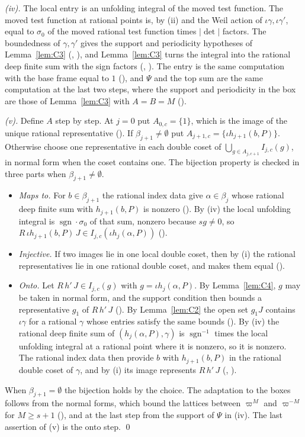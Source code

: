 \documentclass[11pt]{article}
\newcommand{\sgn}{\operatorname{sgn}}
\theoremstyle{definition}
\theoremstyle{remark}
\begin{document}
\emph{(iv).} The local entry is an unfolding integral of the moved test function. The moved test function at rational points is, by (ii) and the Weil action of $\iota\gamma,\iota\gamma'$, equal to $\sigma_0$ of the moved rational test function times $\lvert\det\rvert$ factors. The boundedness of $\gamma,\gamma'$ gives the support and periodicity hypotheses of Lemma~\ref{lem:C3} (, ), and Lemma~\ref{lem:C3} turns the integral into the rational deep finite sum with the sign factors (, ). The entry is the same computation with the base frame equal to $1$ (), and $\Psi$ and the top sum are the same computation at the last two steps, where the support and periodicity in the box are those of Lemma~\ref{lem:C3} with $A=B=M$ ().

\emph{(v).} Define $A$ step by step. At $j=0$ put $A_{0,c}=\{1\}$, which is the image of the unique rational representative (). If $\beta_{j+1}\neq\emptyset$ put $A_{j+1,c}=\{\iota h_{j+1}(b,P)\}$. Otherwise choose one representative in each double coset of $\bigcup_{g\in A_{j,c+1}}I_{j,c}(g)$, in normal form when the coset contains one. The bijection property is checked in three parts when $\beta_{j+1}\ne\emptyset$.
\begin{itemize}[leftmargin=*,itemsep=1pt]
\item \emph{Maps to.} For $b\in\beta_{j+1}$ the rational index data give $\alpha\in\beta_j$ whose rational deep finite sum with $h_{j+1}(b,P)$ is nonzero (). By (iv) the local unfolding integral is $\sgn\cdot\sigma_0$ of that sum, nonzero because $sg\ne0$, so $R\,\iota h_{j+1}(b,P)\,J\in I_{j,c}(\iota h_j(\alpha,P))$ ().
\item \emph{Injective.} If two images lie in one local double coset, then by (i) the rational representatives lie in one rational double coset, and  makes them equal ().
\item \emph{Onto.} Let $R\,h'\,J\in I_{j,c}(g)$ with $g=\iota h_j(\alpha,P)$. By Lemma~\ref{lem:C4}, $g$ may be taken in normal form, and the support condition then bounds a representative $g_1$ of $R\,h'\,J$ (). By Lemma~\ref{lem:C2} the open set $g_1 J$ contains $\iota\gamma$ for a rational $\gamma$ whose entries satisfy the same bounds (). By (iv) the rational deep finite sum of $(h_j(\alpha,P),\gamma)$ is $\sgn^{-1}$ times the local unfolding integral at a rational point where it is nonzero, so it is nonzero. The rational index data then provide $b$ with $h_{j+1}(b,P)$ in the rational double coset of $\gamma$, and by (i) its image represents $R\,h'\,J$ (, ).
\end{itemize}
When $\beta_{j+1}=\emptyset$ the bijection holds by the choice. The adaptation to the boxes follows from the normal forms, which bound the lattices between $\varpi^{M}$ and $\varpi^{-M}$ for $M\ge s+1$ (), and at the last step from the support of $\Psi$ in (iv). The last assertion of (v) is the onto step. \qed
\end{document}
